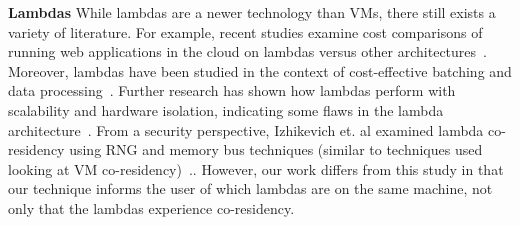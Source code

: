 \textbf{Lambdas}
While lambdas are a newer technology than VMs, there still exists a variety of literature. For example, recent studies examine cost comparisons of running web applications in the cloud on lambdas versus other architectures~\cite{villamizar2016}. Moreover, lambdas have been studied in the context of cost-effective batching and data processing~\cite{kiran2015}. Further research has shown how lambdas perform with scalability and hardware isolation, indicating some flaws in the lambda architecture~\cite{wangusenix2018}. From a security perspective, Izhikevich et. al examined lambda co-residency using RNG and memory bus techniques (similar to techniques used  looking at VM co-residency)~\cite{izhikevich2018}.. However, our work differs from this study in that our technique informs the user of which lambdas are on the same machine, not only that the lambdas experience co-residency.